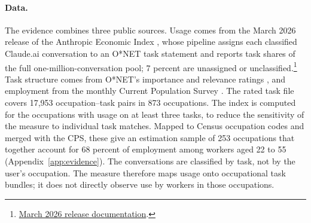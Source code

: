 \documentclass[12pt]{article}
\theoremstyle{plain}
\theoremstyle{definition}
\theoremstyle{remark}
\begin{document}
\paragraph{Data.}
The evidence combines three public sources. Usage comes from the March
2026 release of the Anthropic Economic Index
\citep{MassenkoffEtAl2026AEI}, whose pipeline assigns each classified
Claude.ai conversation to an O*NET task statement and reports task
shares of the full one-million-conversation pool; 7 percent are
unassigned or unclassified.\footnote{\href{https://huggingface.co/datasets/Anthropic/EconomicIndex/blob/main/release_2026_03_24/data_documentation.md}{March 2026 release documentation}.}
Task structure comes from O*NET's
importance and relevance ratings \citep{ONET272}, and employment from the
monthly Current Population Survey \citep{IPUMSCPS2025}. The rated task
file covers 17,953 occupation--task pairs in 873 occupations. The index is computed for the
occupations with usage on at least three tasks, to reduce the sensitivity of the measure to individual task matches. Mapped to
Census occupation codes and merged with the CPS, these give an estimation
sample of 253 occupations that together account for 68 percent of
employment among workers aged 22 to 55 (Appendix~\ref{app:evidence}).
The conversations are classified by task, not by the user's occupation.
The measure therefore maps usage onto occupational task bundles; it
does not directly observe use by workers in those occupations.
\end{document}
